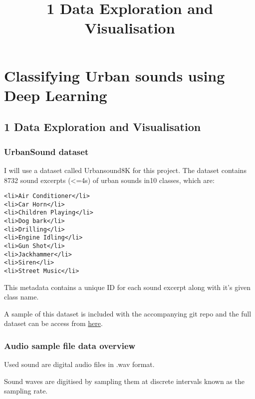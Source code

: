\documentclass[11pt]{article}
\title{1 Data Exploration and Visualisation}
\begin{document}
    
    
    \maketitle
    
    

    
    \section{Classifying Urban sounds using Deep
Learning}\label{classifying-urban-sounds-using-deep-learning}

\subsection{1 Data Exploration and
Visualisation}\label{data-exploration-and-visualisation}

    \subsubsection{UrbanSound dataset}\label{urbansound-dataset}

I will use a dataset called Urbansound8K for this project. The dataset
contains 8732 sound excerpts (\textless{}=4s) of urban sounds in10
classes, which are:

\begin{verbatim}
<li>Air Conditioner</li>
<li>Car Horn</li>
<li>Children Playing</li>
<li>Dog bark</li>
<li>Drilling</li>
<li>Engine Idling</li>
<li>Gun Shot</li>
<li>Jackhammer</li>
<li>Siren</li>
<li>Street Music</li>
\end{verbatim}

This metadata contains a unique ID for each sound excerpt along with
it's given class name.

A sample of this dataset is included with the accompanying git repo and
the full dataset can be access from
\href{https://urbansounddataset.weebly.com/urbansound8k.html}{here}.

    \subsubsection{Audio sample file data
overview}\label{audio-sample-file-data-overview}

Used sound are digital audio files in .wav format.

Sound waves are digitised by sampling them at discrete intervals known
as the sampling rate.
\end{document}
